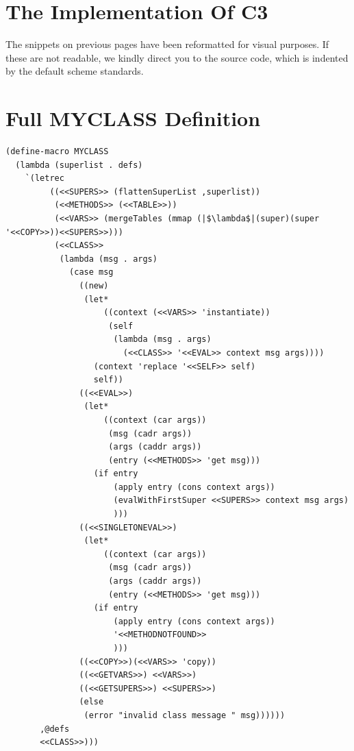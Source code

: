 \documentclass[10pt,a4paper]{scrartcl}
\begin{document}
\section*{The Implementation Of C3}
The snippets on previous pages have been reformatted for visual purposes. If these are not readable, we kindly direct you to the source code, which is indented by the default scheme standards.

\pagebreak
\section*{Full MYCLASS Definition}
\begin{lstlisting}[escapeinside=||]
(define-macro MYCLASS
  (lambda (superlist . defs)
    `(letrec
         ((<<SUPERS>> (flattenSuperList ,superlist))
          (<<METHODS>> (<<TABLE>>))
          (<<VARS>> (mergeTables (mmap (|$\lambda$|(super)(super '<<COPY>>))<<SUPERS>>)))
          (<<CLASS>>
           (lambda (msg . args)
             (case msg
               ((new)
                (let*
                    ((context (<<VARS>> 'instantiate))
                     (self 
                      (lambda (msg . args)
                        (<<CLASS>> '<<EVAL>> context msg args))))
                  (context 'replace '<<SELF>> self)
                  self))
               ((<<EVAL>>)
                (let*
                    ((context (car args))
                     (msg (cadr args))
                     (args (caddr args))
                     (entry (<<METHODS>> 'get msg)))
                  (if entry
                      (apply entry (cons context args))
                      (evalWithFirstSuper <<SUPERS>> context msg args)
                      )))
               ((<<SINGLETONEVAL>>)
                (let*
                    ((context (car args))
                     (msg (cadr args))
                     (args (caddr args))
                     (entry (<<METHODS>> 'get msg)))
                  (if entry
                      (apply entry (cons context args))
                      '<<METHODNOTFOUND>>
                      )))
               ((<<COPY>>)(<<VARS>> 'copy))
               ((<<GETVARS>>) <<VARS>>)
               ((<<GETSUPERS>>) <<SUPERS>>)
               (else
                (error "invalid class message " msg))))))
       ,@defs
       <<CLASS>>)))
\end{lstlisting}
\end{document}
